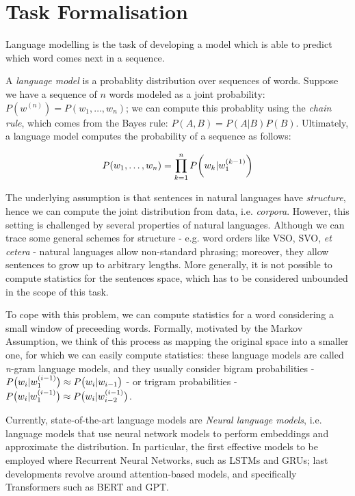 \section{Task Formalisation}
Language modelling is the task of developing a model which is able to predict which word comes next in a sequence. 

A \emph{language model} is a probablity distribution over sequences of words. Suppose we have a sequence of \(n\) words modeled as a joint probability: \(P(w^{(n)}) = P(w_1, \ldots, w_n)\); we can compute this probablity using the \emph{chain rule}, which comes from the Bayes rule: \(P(A, B) = P(A|B)P(B)\). Ultimately, a language model computes the probability of a sequence as follows:

\begin{equation}
    P(w_1, \ldots, w_n)  = \prod_{k=1}^{n}P \parenth[\bigg]{w_k|w_1^{(k-1)}}
\end{equation}

The underlying assumption is that sentences in natural languages have \emph{structure}, hence we can compute the joint distribution from data, i.e. \emph{corpora}. However, this setting is challenged by several properties of natural languages. Although we can trace some general schemes for structure - e.g. word orders like VSO, SVO, \emph{et cetera} - natural languages allow non-standard phrasing; moreover, they allow sentences to grow up to arbitrary lengths. More generally, it is not possible to compute statistics for the sentences space, which has to be considered unbounded in the scope of this task.

To cope with this problem, we can compute statistics for a word considering a small window of preceeding words. Formally, motivated by the Markov Assumption, we think of this process as mapping the original space into a smaller one, for which we can easily compute statistics: these language models are called \emph{n}-gram language models, and they usually consider bigram probabilities - \(P \parenth[\big]{w_i | w_1^{(i-1)}} \approx P \parenth[\big]{w_i | w_{i-1}}\) - or trigram probabilities - \(P\parenth[\big]{w_i | w_1^{(i-1)}} \approx P \parenth[\big]{w_i | w_{i-2}^{(i-1)}}\).

Currently, state-of-the-art language models are \emph{Neural language models}, i.e. language models that use neural network models to perform embeddings and approximate the distribution. In particular, the first effective models to be employed where Recurrent Neural Networks, such as LSTMs and GRUs; last developments revolve around attention-based models\cite{vaswani2023attention}, and specifically Transformers such as BERT\cite{devlin2018bert} and GPT\cite{radford2019Language2}\cite{brown2020language3}. 
